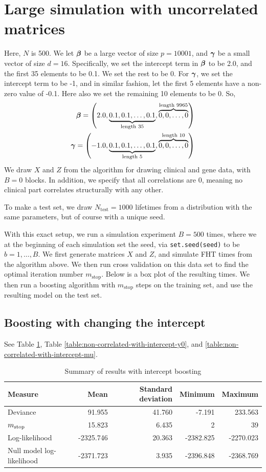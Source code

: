 \section{Large simulation with uncorrelated matrices}
Here, $N$ is 500. We let $\boldsymbol{\beta}$ be a large vector of size $p=10001$, and $\boldsymbol{\gamma}$ be a small vector of size $d=16$. Specifically, we set the intercept term in $\boldsymbol{\beta}$ to be 2.0, and the first 35 elements to be 0.1. We set the rest to be 0. For $\boldsymbol{\gamma}$, we set the intercept term to be -1, and in similar fashion, let the first 5 elements have a non-zero value of -0.1. Here also we set the remaining 10 elements to be 0. So,
\begin{align*}
    \boldsymbol{\beta}=\left(2.0, \underbrace{0.1, 0.1, \ldots, 0.1}_{\text{length 35}}, \overbrace{0, 0, \ldots, 0}^{\text{length 9965}}\right) \\
    \boldsymbol{\gamma}=\left(-1.0, \underbrace{0.1, 0.1, \ldots, 0.1}_{\text{length 5}}, \overbrace{0, 0, \ldots, 0}^{\text{length 10}}\right)
\end{align*}
We draw $X$ and $Z$ from the algorithm for drawing clinical and gene data, with $B=0$ blocks. In addition, we specify that all correlations
are 0, meaning no clinical part correlates structurally with any other.

To make a test set, we draw $N_{\text{test}}=1000$ lifetimes from a distribution with the same parameters, but of course with a unique seed.

With this exact setup, we run a simulation experiment $B=500$ times, where we at the beginning of each simulation set the seed, via \verb|set.seed(seed)| to be $b=1,\ldots,B$. We first generate matrices $X$ and $Z$, and simulate FHT times from the algorithm above. We then run cross validation on this data set to find the optimal iteration number $m_{\text{stop}}$. Below is a box plot of the resulting times. We then run a boosting algorithm with $m_{\text{stop}}$ steps on the training set, and use the resulting model on the test set.

\subsection{Boosting with changing the intercept}
See Table \ref{table:non-correlated-with-intercept-summary}, Table \ref{table:non-correlated-with-intercept-y0}, and \ref{table:non-correlated-with-intercept-mu}.
\begin{table}\caption{Summary of results with intercept boosting}\label{table:non-correlated-with-intercept-summary}
\begin{tabular}{l|rrrr}
Measure &   Mean & Standard deviation &  Minimum &    Maximum \\
\hline
Deviance    &    91.955 & 41.760 &    -7.191 &   233.563 \\
$m_{\text{stop}}$      &    15.823 &  6.435 &     2 &    39 \\
Log-likelihood      & -2325.746 & 20.363 & -2382.825 & -2270.023 \\
Null model log-likelihood & -2371.723 &  3.935 & -2396.848 & -2368.769
\end{tabular}
\end{table}

